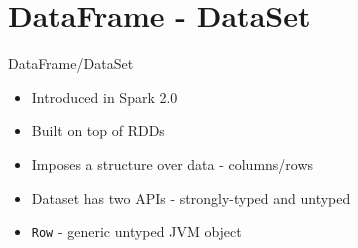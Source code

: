 \documentclass{beamer}
\begin{document}
\section{DataFrame - DataSet}
\begin{frame}[t]{DataFrame/DataSet}
\begin{itemize}
	\item<1-> Introduced in Spark 2.0
	\item<2-> Built on top of RDDs
	\item<3-> Imposes a structure over data - columns/rows
	\item<4-> Dataset has two APIs - strongly-typed and untyped
	\item<5-> \texttt{Row} - generic untyped JVM object
\end{itemize}
\end{frame}
\end{document}
